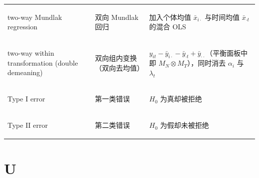\begin{longtable}{@{}>{\bfseries\boldmath\raggedright\arraybackslash}p{4.6cm}>{\raggedright\arraybackslash}p{3.2cm}>{\raggedright\arraybackslash}p{\dimexpr\textwidth-7.8cm-4\tabcolsep\relax}@{}}
two-way Mundlak regression & 双向 Mundlak 回归 & 加入个体均值 $\bar x_{i\cdot}$ 与时间均值 $\bar x_{\cdot t}$ 的混合 OLS \\
two-way within transformation (double demeaning) & 双向组内变换（双向去均值） & $y_{it}-\bar y_{i\cdot}-\bar y_{\cdot t}+\bar y_{\cdot\cdot}$（平衡面板中即 $M_N\otimes M_T$），同时消去 $\alpha_i$ 与 $\lambda_t$ \\
Type I error & 第一类错误 & $H_0$ 为真却被拒绝 \\
Type II error & 第二类错误 & $H_0$ 为假却未被拒绝 \\
\end{longtable}

\par{}\ifdim\dimexpr\pagegoal-\pagetotal\relax<16\baselineskip\newpage\fi
\section*{U}
